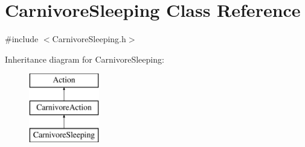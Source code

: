 \hypertarget{class_carnivore_sleeping}{}\section{Carnivore\+Sleeping Class Reference}
\label{class_carnivore_sleeping}


{\ttfamily \#include $<$Carnivore\+Sleeping.\+h$>$}

Inheritance diagram for Carnivore\+Sleeping\+:\begin{figure}[H]
\begin{center}
\leavevmode
\includegraphics[height=3.000000cm]{class_carnivore_sleeping}
\end{center}
\end{figure}
